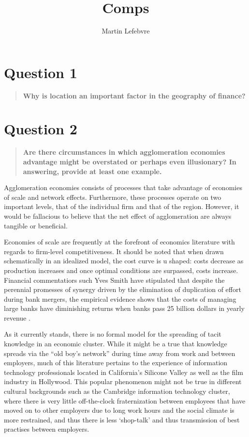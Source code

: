 \documentclass[12pt,letterpaper,notitlepage,onecolumn,final,openbib]{article}
\author{Martin Lefebvre}
\title{Comps}
\begin{document}
 
	
\section{Question 1}
\begin{quotation}
	\textbf{Why is location an important factor in the geography of finance?}
\end{quotation}




\section{Question 2}
\begin{quotation}
	\textbf{Are there circumstances in which agglomeration economies advantage might be overstated or perhaps even illusionary? In answering, provide at least one example.}
\end{quotation}

Agglomeration economies consists of processes that take advantage of economies of scale and network effects.  Furthermore, these processes operate on two important levels, that of the individual firm and that of the region.  However, it would be fallacious to believe that the net effect of agglomeration are always tangible or beneficial.   

Economies of scale are frequently at the forefront of economics literature \cite{Panzar1977} with regards to firm-level competitiveness.  It should be noted that when drawn schematically in an idealized model, the cost curve is u shaped: costs decrease as production increases and once optimal conditions are surpassed, costs increase.  Financial commentatiors such Yves Smith have stipulated that despite the perennial promesses of synergy driven by the elimination of duplication of effort during bank mergers, the empirical evidence shows that the costs of managing large banks have diminishing returns when banks pass 25 billion dollars in yearly revenue \cite{Smith2010}.  


As it currently stands, there is no formal model for the spreading of tacit knowledge in an economic cluster.  While it might be a true that knowledge spreads via the ``old boy's network'' during time away from work and between employers, much of this literature pertains to the experience of information technology professionals located in California's Silicone Valley as well as the film industry in Hollywood.  This popular phenomenon might not be true in different cultural backgrounds such as the Cambridge information technology cluster, where there is very little off-the-clock fraternization between employees that have moved on to other employers due to long work hours and the social climate is more restrained, and thus there is less `shop-talk' and thus transmission of best practises between employers.       
\end{document}
